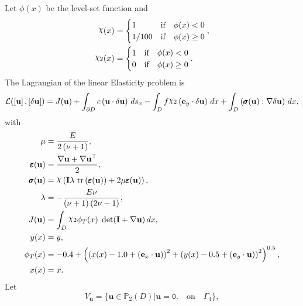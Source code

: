 \documentclass[preview]{standalone}
\let\oldcdot\cdot
\let\cdot\oldcdot
\begin{document}
Let $\phi(x)$ be the level-set function and
 \begin{align*}\raisebox{\depth}{$\chi$}(x) &= \begin{cases} 1 & \mbox{if}\quad \phi(x) < 0 \\ 1/100 & \mbox{if}\quad \phi(x)  \ge 0 \end{cases},\\
\raisebox{\depth}{$\chi_2$}(x) &= \begin{cases} 1 & \mbox{if}\quad \phi(x) < 0 \\ 0 & \mbox{if}\quad \phi(x)  \ge 0 \end{cases}.\end{align*}
The Lagrangian of the linear Elasticity problem is
\begin{dmath*}
\mathcal L(\left[ {\mathbf{ u }}\right],\left[ {\delta\mathbf{  u }}\right]) = J({\mathbf{ u }}) +  \int_{\partial D} c \left( {\mathbf{ u }} \cdot {\delta\mathbf{  u }} \right) \,ds_x -  \int_{D} f \raisebox{\depth}{$\chi_2$} \left( \mathbf e_y \cdot {\delta\mathbf{  u }} \right) \,dx +  \int_{D} \left( \pmb \sigma({\mathbf{ u }}) \mathrel{:}  \nabla {\delta\mathbf{  u }}  \right) \,dx , 
\end{dmath*}
with 
\begin{align*}
\mu &= \frac{E}{2 \left(\nu + 1\right)},\\
\pmb \varepsilon({\mathbf{ u }}) &= \frac{ \nabla {\mathbf{ u }}  +   \nabla {\mathbf{ u }} ^\top }{2},\\
\pmb \sigma({\mathbf{ u }}) &= \raisebox{\depth}{$\chi$} \left(\mathbf{I} \lambda  \,\operatorname{tr}\left(\pmb \varepsilon({\mathbf{ u }})\right)  + 2 \mu \pmb \varepsilon({\mathbf{ u }})\right),\\
\lambda &= - \frac{E \nu}{\left(\nu + 1\right) \left(2 \nu - 1\right)},\\
J({\mathbf{ u }}) &=  \int_{D} \raisebox{\depth}{$\chi_2$} \phi_{T}(x)  \;\operatorname{det}(\mathbf{I} +  \nabla {\mathbf{ u }} )  \,dx,\\
y(x) &= y,\\
\phi_{T}(x) &= -0.4 + \left(\left(x(x) - 1.0 + \left( \mathbf e_x \cdot {\mathbf{ u }} \right)\right)^{2} + \left(y(x) - 0.5 + \left( \mathbf e_y \cdot {\mathbf{ u }} \right)\right)^{2}\right)^{0.5},\\
x(x) &= x.
 \end{align*}
Let
\begin{equation*}
V_{{\mathbf{ u }}} = \{ {\mathbf{ u }} \in \mathbb P_{2}(D)| {\mathbf{ u }} = \mathtt{\text{0.}}  \quad \text{{on}} \quad\Gamma_{4} \},\end{equation*}
\end{document}
